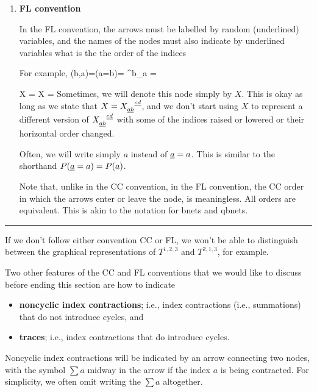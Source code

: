 \begin{enumerate}
\item {\bf FL convention}

In the FL convention,
the arrows must be labelled
by random (underlined)
variables, and
the names of the nodes
must also indicate
by underlined variables
what is the the order of
the indices

For example,
\beq
\delta(b,a)=\indi(a=b)=
\delta^b_a =
\eeq


\beq
{}
X\indices{_\rva_\rvb^\rvc}
=
X
=
\bcen
{}\ecen
\eeq
Sometimes, 
we will denote
this node simply by $X$.
This is okay as long as
we state that $X=X\indices{_\rva_\rvb^\rvc^\rvd}$, and we 
don't start using $X$ 
to represent 
a different version of $X\indices{_\rva_\rvb^\rvc^\rvd}$
with some of the indices
raised or lowered or 
their horizontal order changed.

Often, we will
write simply $a$ instead
of $\rva=a$. This
is similar to
the shorthand
$P(\rva=a)=P(a)$.

Note that,
unlike in the CC 
convention, in the FL
convention, the CC 
order in which the
arrows enter or leave
the node, is meaningless.
All orders are  equivalent. This is
akin to the notation
for bnets and qbnets.


\end{enumerate}
\hrule

If we don't follow either convention CC or FL, we won't
be able to distinguish between
the graphical
representations of $T^{1,2,3}$
and $T^{2,1,3}$, for example.

Two other features
of the CC and FL
conventions that 
we would like to
discuss before 
ending this section are
how to indicate 

\begin{itemize}
\item
{\bf noncyclic index contractions}; i.e., index 
contractions 
(i.e.,
summations)
that do not
introduce cycles, and
\item
{\bf traces}; i.e., 
index contractions
that do introduce cycles.
\end{itemize}

Noncyclic index contractions
will be indicated 
by an arrow connecting
two nodes,
with the symbol
$\sum a$ 
midway
in the arrow if 
the index $a$
is being contracted.
For simplicity,
we often omit
writing the $\sum a$
altogether.

